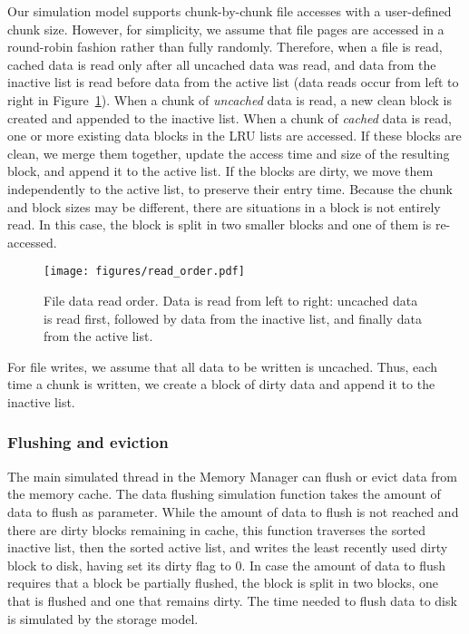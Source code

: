 \documentclass[conference]{IEEEtran}
\begin{document}
    Our simulation model supports chunk-by-chunk file accesses
    with a user-defined chunk size. However, for simplicity, we assume that file pages are
    accessed in a round-robin fashion rather than fully randomly.
    Therefore, when a file is read, cached data is read only after all uncached data was read, and data from the inactive list is read
    before data from the active list
    (data reads occur from left to right in Figure~\ref{fig:read_order}).
    When a chunk of \emph{uncached} data is read, a new clean block is created
    and appended to the inactive list.
    When a chunk of \emph{cached} data is read, one or more existing data blocks in the LRU lists are accessed.
    If these blocks are clean, we merge them together, update the access time and size of the resulting block,
    and append it to the active list.
    If the blocks are dirty, we move them independently to the active list, to preserve their entry time.
    Because the chunk and block sizes may be different, there are situations
    in a block is not entirely read.
    In this case, the block is split in two smaller blocks and one of them is re-accessed.
    \begin{figure}
           \centering
           \texttt{[image: figures/read\_order.pdf]}
           \caption{File data read order. Data is read from left to right: uncached data
           is read first, followed by data from the inactive list, and finally data from the active list. }
           \label{fig:read_order}
    \end{figure}

    For file writes, we assume that all data to be written is
    uncached. Thus, each time a chunk is written, we create a block of dirty data
    and append it to the inactive list.

    \subsubsection{Flushing and eviction}

    The main simulated thread in the Memory Manager can flush or evict data from the
    memory cache. The data flushing simulation
    function takes the amount of data to flush as parameter. While
    the amount of data to flush is not reached and there are dirty
    blocks remaining in cache, this function traverses the sorted
    inactive list, then the sorted active list, and writes the
    least recently used dirty block to disk, having set its dirty
    flag to 0. In case the amount of data to flush requires that a
    block be partially flushed, the block is split in two blocks,
    one that is flushed and one that remains dirty. The time needed
    to flush data to disk is simulated by the storage model.
\end{document}
